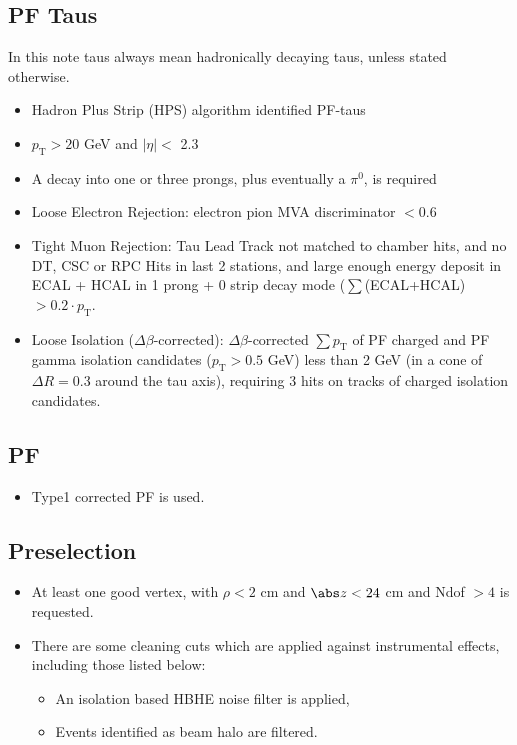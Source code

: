 \subsection{PF Taus}
\label{sec:taus}
In this note taus always mean hadronically decaying taus, unless stated otherwise.
\begin{itemize}
\item Hadron Plus Strip (HPS) algorithm identified PF-taus
\item $p_\mathrm{T} > 20$ GeV and  $|\eta| <$ 2.3
\item A decay into one or three prongs, plus eventually a $\pi^0$, is required
\item Loose Electron Rejection: electron pion MVA discriminator $< 0.6$
\item Tight Muon Rejection: Tau Lead Track not matched to chamber hits, and no DT, CSC or RPC Hits in last 2 stations, and large enough energy deposit in ECAL + HCAL in 1 prong + 0 strip decay mode ($\sum$(ECAL+HCAL) $> 0.2 \cdot p_{\mathrm{T}}$.
\item Loose Isolation ($\Delta\beta$-corrected): $\Delta\beta$-corrected $\sum p_\mathrm{T}$ of PF charged and PF gamma isolation candidates ($p_\mathrm{T} > 0.5$ GeV) less than 2 GeV (in a cone of $\Delta R = 0.3$ around the tau axis), requiring 3 hits on tracks of charged isolation candidates.
\end{itemize}

\subsection{\texorpdfstring{PF \met}{PF MET}}
\begin{itemize}
\item Type1 corrected PF \met is used.
\end{itemize}
\subsection{Preselection}
\label{subsect:presel}
\begin{itemize}
\item At least one good vertex, with $\rho<2$ cm and $\abs z<24$ cm and Ndof $>4$ is requested.
\item There are some cleaning cuts which are applied against instrumental effects, including those listed below:
\begin{itemize}
\item An isolation based HBHE noise filter is applied,
\item Events identified as beam halo are filtered.
\end{itemize}
\end{itemize}

